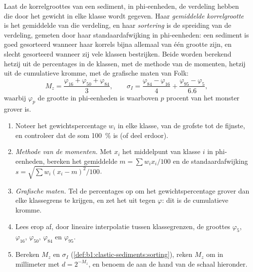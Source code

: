 \begin{definition}\label{def:b1:clastic-sediments:sorting}
Laat de korrelgroottes van een sediment, in phi-eenheden, de verdeling hebben die door het gewicht in elke klasse wordt gegeven. Haar \emph{gemiddelde korrelgrootte} is het gemiddelde van die verdeling, en haar \emph{sortering} is de spreiding van de verdeling, gemeten door haar standaardafwijking in phi-eenheden: een sediment is goed gesorteerd wanneer haar korrels bijna allemaal van één grootte zijn, en slecht gesorteerd wanneer zij vele klassen bestrijken. Beide worden berekend hetzij uit de percentages in de klassen, met de methode van de momenten, hetzij uit de cumulatieve kromme, met de grafische maten van Folk:
\[
  M_z = \frac{\varphi_{16} + \varphi_{50} + \varphi_{84}}{3}, \qquad
  \sigma_I = \frac{\varphi_{84} - \varphi_{16}}{4} + \frac{\varphi_{95} - \varphi_{5}}{6.6},
\]
waarbij $\varphi_p$ de grootte in phi-eenheden is waarboven $p$ procent van het monster grover is.
\end{definition}

\begin{method}\label{met:b1:clastic-sediments:graphic}
\begin{enumerate}
  \item Noteer het gewichtspercentage $w_i$ in elke klasse, van de grofste tot de fijnste, en controleer dat de som \qty{100}{\percent} is (of deel erdoor).
  \item \emph{Methode van de momenten.} Met $x_i$ het middelpunt van klasse $i$ in phi-eenheden, bereken het gemiddelde $m = \sum w_i x_i / 100$ en de standaardafwijking $s = \sqrt{\sum w_i (x_i - m)^2 / 100}$.
  \item \emph{Grafische maten.} Tel de percentages op om het gewichtspercentage grover dan elke klassegrens te krijgen, en zet het uit tegen $\varphi$: dit is de cumulatieve kromme.
  \item Lees erop af, door lineaire interpolatie tussen klassegrenzen, de groottes $\varphi_5$, $\varphi_{16}$, $\varphi_{50}$, $\varphi_{84}$ en $\varphi_{95}$.
  \item Bereken $M_z$ en $\sigma_I$ (\cref{def:b1:clastic-sediments:sorting}), reken $M_z$ om in millimeter met $d = 2^{-M_z}$, en benoem de  aan de hand van de schaal hieronder.
\end{enumerate}
\end{method}

